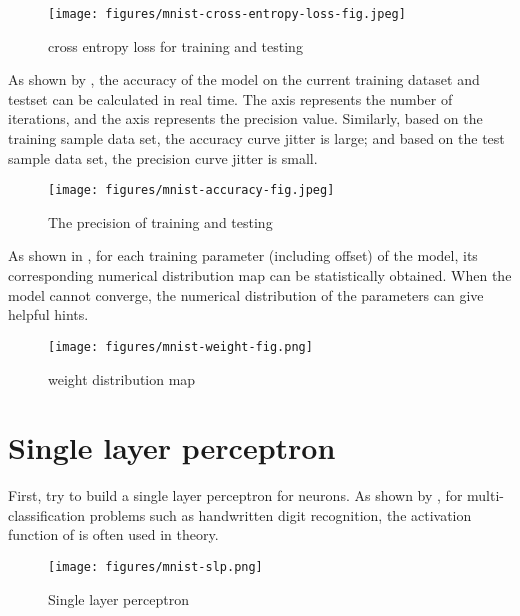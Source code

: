\begin{content}
\begin{content}
\begin{figure}[H]
\centering
\texttt{[image: figures/mnist-cross-entropy-loss-fig.jpeg]}
\caption{cross entropy loss for training and testing}
 \label{fig:mnist-cross-entropy-loss-fig}
\end{figure}

As shown by , the accuracy of the model on the current training dataset and testset can be calculated in real time. The  axis represents the number of iterations, and the  axis represents the precision value. Similarly, based on the training sample data set, the accuracy curve jitter is large; and based on the test sample data set, the precision curve jitter is small.

\begin{figure}[H]
\centering
\texttt{[image: figures/mnist-accuracy-fig.jpeg]}
\caption{The precision of training and testing}
 \label{fig:mnist-accuracy-fig}
\end{figure}

As shown in , for each training parameter (including offset) of the model, its corresponding numerical distribution map can be statistically obtained. When the model cannot converge, the numerical distribution of the parameters can give helpful hints.

\begin{figure}[H]
\centering
\texttt{[image: figures/mnist-weight-fig.png]}
\caption{weight distribution map}
 \label{fig:mnist-weight-fig}
\end{figure}

\end{content}

\section{Single layer perceptron}

\begin{content}

First, try to build a single layer perceptron for  neurons. As shown by , for multi-classification problems such as handwritten digit recognition, the activation function of  is often used in theory.

\begin{figure}[H]
\centering
\texttt{[image: figures/mnist-slp.png]}
\caption{Single layer perceptron}
 \label{fig:mnist-slp}
\end{figure}


\end{content}
\end{content}

